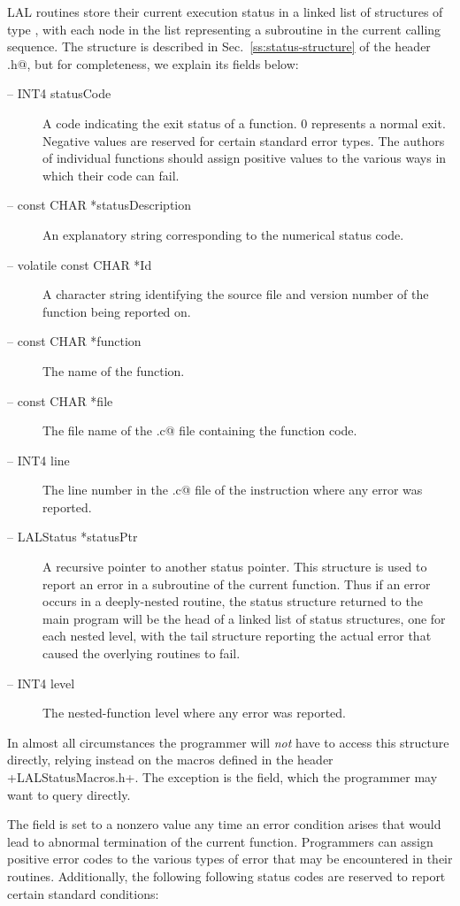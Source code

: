 \documentclass[10pt]{ligodcc}
\makeatletter
\def\verb{\relax\ifmmode\hbox\else\leavevmode\null\fi
  \bgroup
    \color{blue}\small
    \verb@eol@error \let\do\@makeother \dospecials
    \verbatim@font\@noligs
    \@ifstar\@sverb\@verb}
\renewcommand{\texttt}[1]{{\ttfamily\color{blue}#1}}
\makeatother
\begin{document}
LAL routines store their current execution status in a linked list of
structures of type \verb@LALStatus@, with each node in the list
representing a subroutine in the current calling sequence.  The
\verb@LALStatus@ structure is described in Sec.~\ref{ss:status-structure}
of the header \verb@LALDatatypes.h@, but for completeness, we explain
its fields below:
\begin{description}
\item[-- \texttt{INT4 statusCode}] A code indicating the exit status of a
function.  0 represents a normal exit.  Negative values are reserved
for certain standard error types.  The authors of individual functions
should assign positive values to the various ways in which their code
can fail.
\item[-- \texttt{const CHAR *statusDescription}] An explanatory string
corresponding to the numerical status code.
\item[-- \texttt{volatile const CHAR *Id}] A character string identifying
the source file and version number of the function being reported on.
\item[-- \texttt{const CHAR *function}] The name of the function.
\item[-- \texttt{const CHAR *file}] The file name of the \verb@.c@ file
containing the function code.
\item[-- \texttt{INT4 line}] The line number in the \verb@.c@ file of the
instruction where any error was reported.
\item[-- \texttt{LALStatus *statusPtr}] A recursive pointer to another
status pointer.  This structure is used to report an error in a
subroutine of the current function.  Thus if an error occurs in a
deeply-nested routine, the status structure returned to the main
program will be the head of a linked list of status structures, one
for each nested level, with the tail structure reporting the actual
error that caused the overlying routines to fail.
\item[-- \texttt{INT4 level}] The nested-function level where any error
was reported.
\end{description}
In almost all circumstances the programmer will \emph{not} have to
access this structure directly, relying instead on the macros defined
in the header \verb+LALStatusMacros.h+.  The exception is the \verb@statusCode@
field, which the programmer may want to query directly.

The \verb@statusCode@ field is set to a nonzero value any time an
error condition arises that would lead to abnormal termination of the
current function.  Programmers can assign positive error codes to the
various types of error that may be encountered in their routines.
Additionally, the following following status codes are reserved to
report certain standard conditions:
\end{document}
